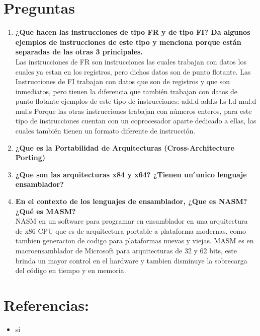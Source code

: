 \documentclass{article}
\begin{document}
	\section*{Preguntas}
  \begin{enumerate}
    \item \textbf{¿Que hacen las instrucciones de tipo FR y de tipo FI? Da algunos ejemplos de instrucciones de este tipo y menciona porque están separadas de las otras 3 principales.\\}
	Las instrucciones de FR son instrucciones las cuales trabajan con datos los cuales ya estan en los registros, pero dichos datos son de punto flotante.
	Las Instrucciones de FI trabajan con datos que son de registros y que son inmediatos, pero tienen la diferencia que también trabajan con datos de punto flotante
	ejemplos de este tipo de instrucciones:
	add.d 
	add.s
	l.s
	l.d
	mul.d
	mul.s
	Porque las otras instrucciones trabajan con números enteros, para este tipo de instrucciones cuentan con un coprocesador aparte dedicado a ellas, las cuales también tienen un formato diferente de 		instrucción.

    \item \textbf{¿Que es la Portabilidad de Arquitecturas (Cross-Architecture Porting)\\}
    \item \textbf{¿Que son las arquitecturas x84 y x64? ¿Tienen un  ́unico lenguaje ensamblador?\\}
    \item \textbf{En el contexto de los lenguajes de ensamblador, ¿Que es NASM? ¿Qué es MASM?\\}
	NASM en un software para programar en ensamblador en una arquitectura de x86 CPU que es de arquitectura portable a plataforma modernas, como tambien generacion de codigo para plataformas nuevas y viejas.
	MASM es en macroensamblador de Microsoft para arquitecturas de 32 y 62 bits, este brinda un mayor control en el hardware y tambien disminuye la sobrecarga del código en tiempo y en memoria.

  \end{enumerate}
  \section*{Referencias:}
		\begin{itemize}
			\item si
		\end{itemize}
	\restoregeometry
\end{document}
